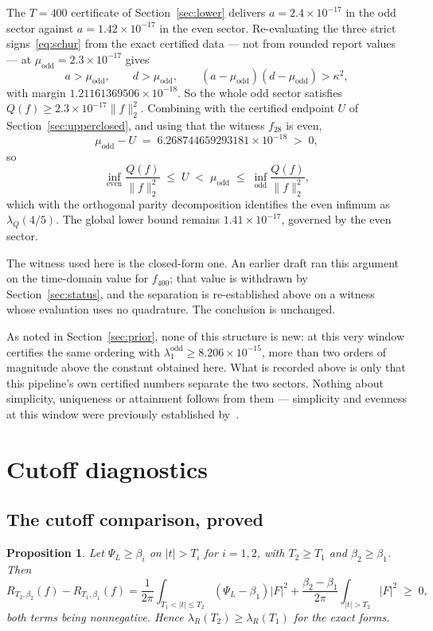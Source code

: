 \documentclass[11pt,a4paper]{article}
\newtheorem{proposition}[theorem]{Proposition}
\theoremstyle{definition}
\theoremstyle{remark}
\newcommand{\lQ}{\lambda_{Q}}
\newcommand{\lR}{\lambda_{R}}
\newcommand{\PsiL}{\Psi_{L}}
\begin{document}
The $T = 400$ certificate of Section~\ref{sec:lower} delivers $a = 2.4\times
10^{-17}$ in the odd sector against $a = 1.42\times10^{-17}$ in the even sector.
Re-evaluating the three strict signs~\eqref{eq:schur} from the exact certified
data --- not from rounded report values --- at $\mu_{\mathrm{odd}} =
2.3\times10^{-17}$ gives
\[
   a > \mu_{\mathrm{odd}},\qquad d > \mu_{\mathrm{odd}},\qquad
   (a - \mu_{\mathrm{odd}})(d - \mu_{\mathrm{odd}}) > \kappa^2 ,
\]
with margin $1.21161369506\times10^{-18}$. So the whole odd sector satisfies
$Q(f) \ge 2.3\times10^{-17}\|f\|_2^2$. Combining with the certified endpoint $U$
of Section~\ref{sec:upperclosed}, and using that the witness $f_{28}$ is even,
\[
   \mu_{\mathrm{odd}} - U \;=\; 6.268744659293181\times10^{-18}
   \;>\; 0 ,
\]
so
\[
   \inf_{\text{even}} \frac{Q(f)}{\|f\|_2^2} \;\le\; U \;<\;
   \mu_{\mathrm{odd}} \;\le\; \inf_{\text{odd}} \frac{Q(f)}{\|f\|_2^2},
\]
which with the orthogonal parity decomposition identifies the even infimum as
$\lQ(4/5)$. The global lower bound remains $1.41\times10^{-17}$, governed by the
even sector.

The witness used here is the closed-form one. An earlier draft ran this argument
on the time-domain value for $f_{400}$; that value is withdrawn by
Section~\ref{sec:status}, and the separation is re-established above on a
witness whose evaluation uses no quadrature. The conclusion is unchanged.

As noted in Section~\ref{sec:prior}, none of this structure is new: at this very
window \cite[Thm.~6.2]{Zhu} certifies the same ordering with
$\lambda^{\mathrm{odd}}_1 \ge 8.206\times10^{-15}$, more than two orders of
magnitude above the constant obtained here. What is recorded above is only that
this pipeline's own certified numbers separate the two sectors. Nothing about
simplicity, uniqueness or attainment follows from them --- simplicity and
evenness at this window were previously established by~\cite[Thm.~6.2]{Zhu}.

\section{Cutoff diagnostics}
\label{sec:cutoff}

\subsection{The cutoff comparison, proved}

\begin{proposition}
\label{prop:cutoff}
Let $\PsiL \ge \beta_i$ on $|t| > T_i$ for $i = 1,2$, with $T_2 \ge T_1$ and
$\beta_2 \ge \beta_1$. Then
\[
   R_{T_2,\beta_2}(f) - R_{T_1,\beta_1}(f)
   = \frac{1}{2\pi}\int_{T_1 < |t| \le T_2} (\PsiL - \beta_1)|F|^2
   + \frac{\beta_2 - \beta_1}{2\pi}\int_{|t| > T_2} |F|^2
   \;\ge\; 0 ,
\]
both terms being nonnegative. Hence $\lR(T_2) \ge \lR(T_1)$ for the exact forms.
\end{proposition}
\end{document}
